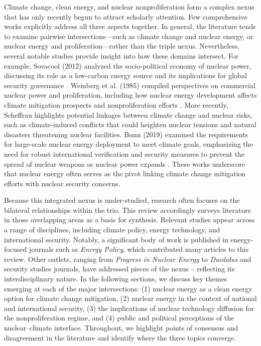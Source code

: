 \documentclass[11,5 pt]{article}
\begin{document}
Climate change, clean energy, and nuclear nonproliferation form a complex nexus that has only recently begun to attract scholarly attention. Few comprehensive works explicitly address all three aspects together. In general, the literature tends to examine pairwise intersections—such as climate change and nuclear energy, or nuclear energy and proliferation—rather than the triple nexus. Nevertheless, several notable studies provide insight into how these domains intersect. For example, Sovacool (2012) analyzed the socio-political economy of nuclear power, discussing its role as a low-carbon energy source and its implications for global security governance \cite{Sovacool20121}. Weinberg et al. (1985) compiled perspectives on commercial nuclear power and proliferation, including how nuclear energy development affects climate mitigation prospects and nonproliferation efforts \cite{weinberg1985nuclear}. More recently, Scheffran \cite{scheffran2015climate} highlights potential linkages between climate change and nuclear risks, such as climate-induced conflicts that could heighten nuclear tensions and natural disasters threatening nuclear facilities. Bunn (2019) examined the requirements for large-scale nuclear energy deployment to meet climate goals, emphasizing the need for robust international verification and security measures to prevent the spread of nuclear weapons as nuclear power expands \cite{bunn2019nuclear}. These works underscore that nuclear energy often serves as the pivot linking climate change mitigation efforts with nuclear security concerns.

Because this integrated nexus is under-studied, research often focuses on the bilateral relationships within the trio. This review accordingly surveys literature in those overlapping areas as a basis for synthesis. Relevant studies appear across a range of disciplines, including climate policy, energy technology, and international security. Notably, a significant body of work is published in energy-focused journals such as \textit{Energy Policy}, which contributed many articles to this review. Other outlets, ranging from \textit{Progress in Nuclear Energy} to \textit{Daedalus} and security studies journals, have addressed pieces of the nexus – reflecting its interdisciplinary nature. In the following sections, we discuss key themes emerging at each of the major intersections: (1) nuclear energy as a clean energy option for climate change mitigation, (2) nuclear energy in the context of national and international security, (3) the implications of nuclear technology diffusion for the nonproliferation regime, and (4) public and political perceptions of the nuclear–climate interface. Throughout, we highlight points of consensus and disagreement in the literature and identify where the three topics converge.
\end{document}
